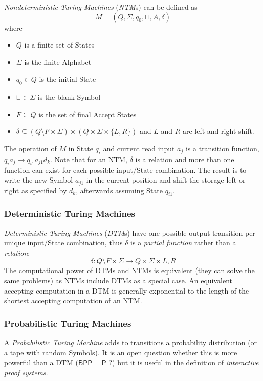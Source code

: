 \emph{Nondeterministic Turing Machines} (\emph{NTM}s) can be defined
as
    \[
        M = (Q, \Sigma, q_0, \sqcup, A, \delta)
    \]
where
\begin{itemize}
\item $Q$ is a finite set of States
\item $\Sigma$ is the finite Alphabet
\item $q_0 \in Q$ is the initial State
\item $\sqcup \in \Sigma$ is the blank Symbol
\item $F \subseteq Q$ is the set of final Accept States
\item $\delta \subseteq (Q \setminus F \times \Sigma) \times (Q \times
  \Sigma \times \{L,R\})$ and $L$ and $R$ are left and right shift.
\end{itemize}

The operation of $M$ in State $q_i$ and current read input $a_j$ is a
transition function, $q_i a_j \rightarrow q_{i1} a_{j1} d_k$. Note
that for an NTM, $\delta$ is a relation and more than one function can
exist for each possible input/State combination. The result is to
write the new Symbol $a_{j1}$ in the current position and shift the
storage left or right as specified by $d_k$, afterwards assuming State
$q_{i1}$.



\subsubsection{Deterministic Turing Machines}

\emph{Deterministic Turing Machines} (\emph{DTM}s) have one possible
output transition per unique input/State combination, thus $\delta$ is
a \emph{partial function} rather than a \emph{relation}:
\[
    \delta : Q \setminus F \times \Sigma \rightarrow Q \times
    \Sigma \times {L,R}
\]
The computational power of DTMs and NTMs is equivalent (they can solve
the same problems) as NTMs include DTMs as a special case. An
equivalent accepting computation in a DTM is generally exponential to
the length of the shortest accepting computation of an NTM.



\subsubsection{Probabilistic Turing Machines}

A \emph{Probabilistic Turing Machine} adds to transitions a
probability distribution (or a tape with random Symbols). It is an
open question whether this is more powerful than a DTM
($\mathsf{BPP}=\mathsf{P}$ ?)  but it is useful in the definition of
\emph{interactive proof systems}. %



